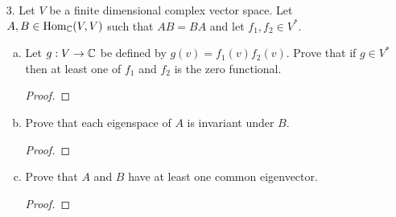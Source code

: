 \begin{itemize}
\begin{enumerate}[(a)]
\item Find the minimal and the characteristic polynomials of $AB$.
\begin{proof}
    The characteristic for $A$ is $x^{10}$; minimal is $x^4$. In this case, since $B$ is invertible and commutes with $A$, $AB$ will have the same characteristic and minimal polynomial as $A$.
\end{proof}

\item Prove that $I - A$ is invertible and express it as a polynomial of $A$.
\begin{proof}
    This is a ring-theoretic property of nilpotent elements. Let $\lambda_i$ be the eigenvalues of $A$. Then the eigenvalues of $I-A$ will look like $1-\lambda_i$. But since $A$ is nilpotent, all of its eigenvalues are $0$, hence the eigenvalues of $I-A$ are only $1$'s. To express the inverse as a polynomial, simply compute 
    $$(I-A)(I+A+A^2+A^3) = I.$$
    Note: at heart, this is really a Taylor series, truncated
    $$\frac{1}{1-x} = 1+x+x^2+x^3+...$$
\end{proof}
\end{enumerate}










\item[3.] Let $V$ be a finite dimensional complex vector space. Let $A, B \in \text{Hom}_{\mathbb{C}}(V, V)$ such
that $AB = BA$ and let $f_1, f_2 \in V^{*}$.
\begin{enumerate}[(a)]
\item Let $g : V \rightarrow \mathbb{C}$ be defined by $g(v) = f_1(v)f_2(v)$. Prove that if
$g \in V^{*}$
then at least one of $f_1$ and $f_2$ is the zero functional.
\begin{proof}

\end{proof}

\item Prove that each eigenspace of $A$ is invariant under $B$.
\begin{proof}

\end{proof}

\item Prove that $A$ and $B$ have at least one common eigenvector.
\begin{proof}

\end{proof}


\end{enumerate}
\end{itemize}

